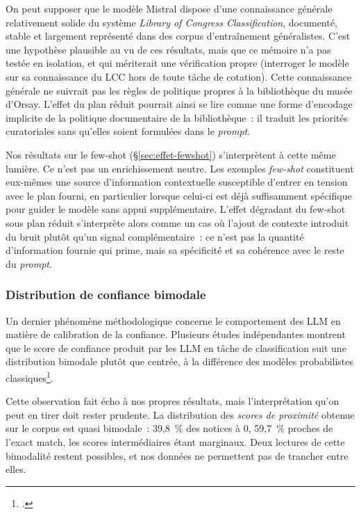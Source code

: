 On peut supposer que le modèle Mistral dispose d'une connaissance générale relativement solide du système \textit{Library of Congress Classification}, documenté, stable et largement représenté dans des corpus d'entraînement généralistes. C’est une hypothèse plausible au vu de ces résultats, mais que ce mémoire n'a pas testée en isolation, et qui mériterait une vérification propre (interroger le modèle sur sa connaissance du LCC hors de toute tâche de cotation). Cette connaissance générale ne suivrait pas les règles de politique propres à la bibliothèque du musée d'Orsay. L'effet du plan réduit pourrait ainsi se lire comme une forme d'encodage implicite de la politique documentaire de la bibliothèque~: il traduit les priorités curatoriales sans qu'elles soient formulées dans le \textit{prompt}.

Nos résultats sur le few-shot (\S\ref{sec:effet-fewshot}) s'interprètent à cette même lumière. Ce n’est pas un enrichissement neutre. Les exemples \textit{few-shot} constituent eux-mêmes une source d'information contextuelle susceptible d'entrer en tension avec le plan fourni, en particulier lorsque celui-ci est déjà suffisamment spécifique pour guider le modèle sans appui supplémentaire. L'effet dégradant du few-shot sous plan réduit s'interprète alors comme un cas où l'ajout de contexte introduit du bruit plutôt qu'un signal complémentaire~: ce n'est pas la quantité d'information fournie qui prime, mais sa spécificité et sa cohérence avec le reste du \textit{prompt}. 

\subsubsection*{Distribution de confiance bimodale}

Un dernier phénomène méthodologique concerne le comportement des LLM en matière de calibration de la confiance. Plusieurs études indépendantes montrent que le score de confiance produit par les LLM en tâche de classification suit une distribution bimodale plutôt que centrée, à la différence des modèles probabilistes classiques\footcite{bipolarisation2026}.

Cette observation fait écho à nos propres résultats, mais l'interprétation qu'on peut en tirer doit rester prudente. La distribution des \emph{scores de proximité} obtenue sur le corpus est quasi bimodale~: 39,8~\% des notices à 0, 59,7~\% proches de l'exact match, les scores intermédiaires étant marginaux. Deux lectures de cette bimodalité restent possibles, et nos données ne permettent pas de trancher entre elles. 


